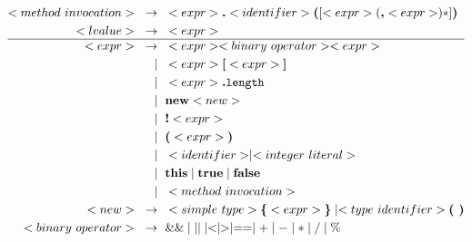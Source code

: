 \documentclass[a4paper,12pt]{article}
\newcommand{\bb}[1]{\textbf{#1}}
\newcommand{\ttt}[1]{\texttt{#1}}
\newcommand{\s}{\text{ }}
\newcommand{\bracel}{\textbraceleft}
\newcommand{\bracer}{\textbraceright}
\begin{document}
\begin{align*}
<method\s invocation>\s \to \s &<expr> \bb{.} <identifier> \bb{(} [ <expr> (\bb{,} <expr>)* ] \bb{)} \\
<lvalue>\s \to \s &<expr> \\
\hline
<expr>\s \to \s &<expr> <binary\s operator> <expr> \\
    \mid \s    &<expr> \bb{[} <expr> \bb{]} \\
    \mid \s    &<expr> \bb{.}\ttt{length} \\
    \mid \s    &\bb{new} <new>\\
    \mid \s    &\bb{!} <expr> \\
    \mid \s    &\bb{(} <expr> \bb{)} \\
    \mid \s    &<identifier> \mid <integer\s literal> \\
    \mid \s    &\bb{this} \mid \bb{true} \mid \bb{false} \\
    \mid \s    &<method\s invocation> \\
<new>\s \to \s &<simple\s type> \bb{\bracel} <expr> \bb{\bracer} \mid <type\s identifier> \bb{( )} \\ 
<binary\s operator>\s \to \s & \&\& \mid || \mid < \mid > \mid == \mid + \mid - \mid * \mid / \mid \% 
\end{align*}
\end{document}
